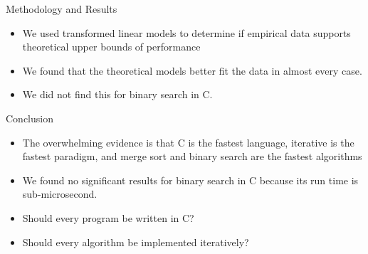 \documentclass[]{beamer}
\begin{document}
\begin{frame}[t]{Methodology and Results}
\begin{itemize}
    \item We used transformed linear models to determine if empirical data supports theoretical upper bounds of performance
    \item We found that the theoretical models better fit the data in almost every case.
    \item We did not find this for binary search in C.
\end{itemize}
\end{frame}

\begin{frame}[t]{Conclusion}
\begin{itemize}
	\item The overwhelming evidence is that C is the fastest language, iterative is the fastest paradigm, and merge sort and binary search are the fastest algorithms
    \item We found no significant results for binary search in C because its run time is sub-microsecond.
    \item Should every program be written in C?
    \item Should every algorithm be implemented iteratively?
\end{itemize}
\end{frame}
\end{document}
